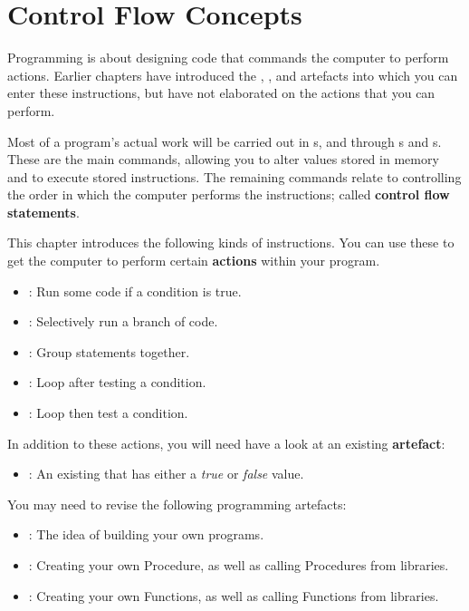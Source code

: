 \clearpage
\section{Control Flow Concepts} %
\label{sec:control_flow_concepts}

Programming is about designing code that commands the computer to perform actions. Earlier chapters have introduced the , , and  artefacts into which you can enter these instructions, but have not elaborated on the actions that you can perform.

Most of a program's actual work will be carried out in s, and through s and s. These are the main commands, allowing you to alter values stored in memory and to execute stored instructions. The remaining commands relate to controlling the order in which the computer performs the instructions; called \textbf{control flow statements}.

This chapter introduces the following kinds of instructions. You can use these to get the computer to perform certain \textbf{actions} within your program.
\begin{itemize}
  \item {}: Run some code if a condition is true.
  \item {}: Selectively run a branch of code.
  \item {}: Group statements together.
  \item {}: Loop after testing a condition.
  \item {}: Loop then test a condition.
\end{itemize}

In addition to these actions, you will need have a look at an existing \textbf{artefact}:
\begin{itemize}
  \item {}: An existing  that has either a \emph{true} or \emph{false} value.
\end{itemize}

\bigskip

You may need to revise the following programming artefacts:
\begin{itemize}
  \item {}: The idea of building your own programs.
  \item {}: Creating your own Procedure, as well as calling Procedures from libraries.
  \item {}: Creating your own Functions, as well as calling Functions from libraries.
\end{itemize}

